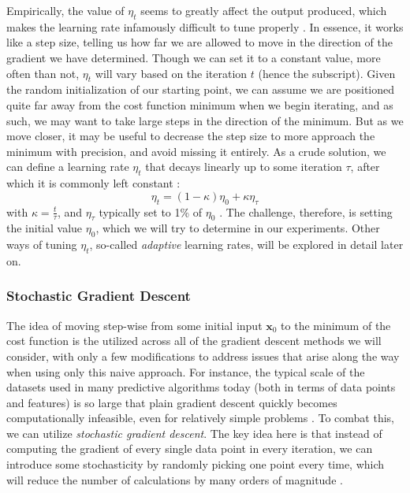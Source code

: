 Empirically, the value of $\eta_t$ seems to greatly affect the output produced, which makes the learning rate infamously difficult to tune properly \cite{deeplearningbookChapter8}. In essence, it works like a step size, telling us how far we are allowed to move in the direction of the gradient we have determined. Though we can set it to a constant value, more often than not, $\eta_t$ will vary based on the iteration $t$ (hence the subscript). Given the random initialization of our starting point, we can assume we are positioned quite far away from the cost function minimum when we begin iterating, and as such, we may want to take large steps in the direction of the minimum. But as we move closer, it may be useful to decrease the step size to more approach the minimum with precision, and avoid missing it entirely. As a crude solution, we can define a learning rate $\eta_t$ that decays linearly up to some iteration $\tau$, after which it is commonly left constant \cite{deeplearningbookChapter8}: 
\[\eta_t = (1- \kappa)\eta_0 + \kappa \eta_\tau \]
with $\kappa = \frac{t}{\tau}$, and $\eta_\tau$ typically set to 1\% of $\eta_0$ \cite{deeplearningbookChapter8}. The challenge, therefore, is setting the initial value $\eta_0$, which we will try to determine in our experiments. Other ways of tuning $\eta_t$, so-called \emph{adaptive} learning rates, will be explored in detail later on.

\subsubsection{Stochastic Gradient Descent}
The idea of moving step-wise from some initial input $\boldsymbol x_0$ to the minimum of the cost function is the utilized across all of the gradient descent methods we will consider, with only a few modifications to address issues that arise along the way when using only this naive approach. For instance, the typical scale of the datasets used in many predictive algorithms today (both in terms of data points and features) is so large that plain gradient descent quickly becomes computationally infeasible, even for relatively simple problems \cite{sgdYouTube}. To combat this, we can utilize \emph{stochastic gradient descent}. The key idea here is that instead of computing the gradient of every single data point in every iteration, we can introduce some stochasticity by randomly picking one point every time, which will reduce the number of calculations by many orders of magnitude \cite{sgdYouTube}. 

